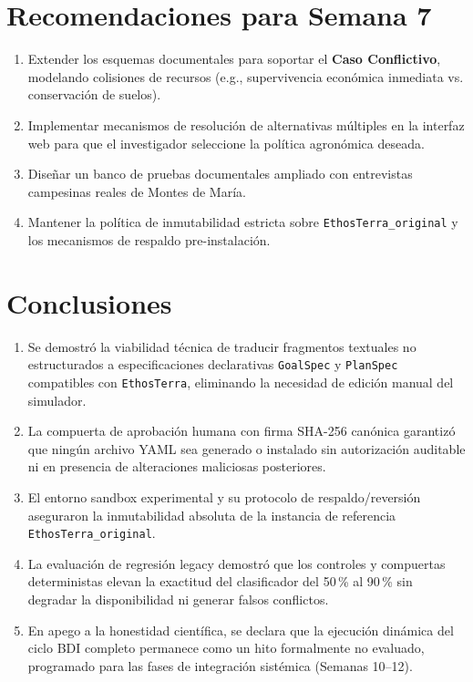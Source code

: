 \documentclass[11pt,a4paper]{article}
\begin{document}
\section{Recomendaciones para Semana 7}
\begin{enumerate}[leftmargin=*]
    \item Extender los esquemas documentales para soportar el \textbf{Caso Conflictivo}, modelando colisiones de recursos (e.g., supervivencia económica inmediata vs. conservación de suelos).
    \item Implementar mecanismos de resolución de alternativas múltiples en la interfaz web para que el investigador seleccione la política agronómica deseada.
    \item Diseñar un banco de pruebas documentales ampliado con entrevistas campesinas reales de Montes de María.
    \item Mantener la política de inmutabilidad estricta sobre \texttt{EthosTerra\_original} y los mecanismos de respaldo pre-instalación.
\end{enumerate}

\section{Conclusiones}
\begin{enumerate}[leftmargin=*]
    \item Se demostró la viabilidad técnica de traducir fragmentos textuales no estructurados a especificaciones declarativas \texttt{GoalSpec} y \texttt{PlanSpec} compatibles con \texttt{EthosTerra}, eliminando la necesidad de edición manual del simulador.
    \item La compuerta de aprobación humana con firma SHA-256 canónica garantizó que ningún archivo YAML sea generado o instalado sin autorización auditable ni en presencia de alteraciones maliciosas posteriores.
    \item El entorno sandbox experimental y su protocolo de respaldo/reversión aseguraron la inmutabilidad absoluta de la instancia de referencia \texttt{EthosTerra\_original}.
    \item La evaluación de regresión legacy demostró que los controles y compuertas deterministas elevan la exactitud del clasificador del 50\,\% al 90\,\% sin degradar la disponibilidad ni generar falsos conflictos.
    \item En apego a la honestidad científica, se declara que la ejecución dinámica del ciclo BDI completo permanece como un hito formalmente no evaluado, programado para las fases de integración sistémica (Semanas 10--12).
\end{enumerate}
\end{document}
